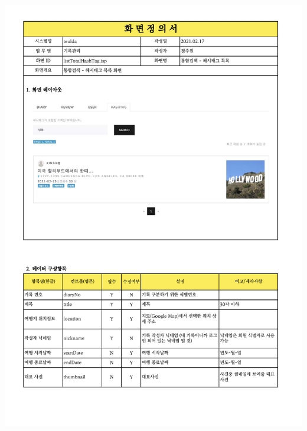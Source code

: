{{{{{{{{{{{{{{{{{{{{{{{{{{{{{{{{{{{{{{{{{{{{{{{{{{{{{{{{{{{{{{{{{{{{{{{{{{{{{{{{{{{{\includegraphics[width=20cm]{./Figure/Design/Display/totalSearch/totalSearch_07.pdf} \\
}}}}}}}}}}}}}}}}}}}}}}}}}}}}}}}}}}}}}}}}}}}}}}}}}}}}}}}}}}}}}}}}}}}}}}}}}}}}}}}}}}}}
